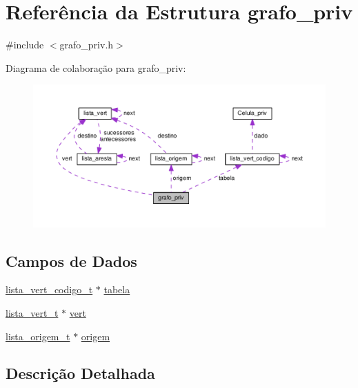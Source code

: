 \hypertarget{structgrafo__priv}{}\section{Referência da Estrutura grafo\+\_\+priv}
\label{structgrafo__priv}


{\ttfamily \#include $<$grafo\+\_\+priv.\+h$>$}



Diagrama de colaboração para grafo\+\_\+priv\+:\nopagebreak
\begin{figure}[H]
\begin{center}
\leavevmode
\includegraphics[width=350pt]{structgrafo__priv__coll__graph}
\end{center}
\end{figure}
\subsection*{Campos de Dados}
\begin{DoxyCompactItemize}
\item 
\hyperlink{grafo__priv_8h_ae17c76eddcd8bd44e7d91faf7c00e2e5}{lista\+\_\+vert\+\_\+codigo\+\_\+t} $\ast$ \hyperlink{structgrafo__priv_a7aaee4699517501a8ca504043ef78ddb}{tabela}
\item 
\hyperlink{grafo__priv_8h_aecb68281fecb412bf6427dd6a07d5077}{lista\+\_\+vert\+\_\+t} $\ast$ \hyperlink{structgrafo__priv_a6f7e609364c2e69e02c56860b1a2c3ad}{vert}
\item 
\hyperlink{grafo__priv_8h_a91c8b187403e9724a757c92c941ab631}{lista\+\_\+origem\+\_\+t} $\ast$ \hyperlink{structgrafo__priv_a49b9f7cfbed0b2dff3c5b373d79385db}{origem}
\end{DoxyCompactItemize}


\subsection{Descrição Detalhada}


